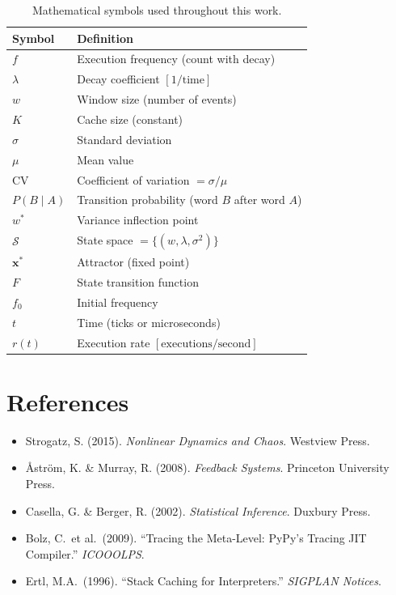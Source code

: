 \begin{table}[h]
\centering
\caption{Mathematical symbols used throughout this work.}
\label{tab:notation}
\begin{tabular}{ll}
\toprule
\textbf{Symbol} & \textbf{Definition} \\
\midrule
$f$ & Execution frequency (count with decay) \\
$\lambda$ & Decay coefficient $[1/\text{time}]$ \\
$w$ & Window size (number of events) \\
$K$ & Cache size (constant) \\
$\sigma$ & Standard deviation \\
$\mu$ & Mean value \\
$\mathrm{CV}$ & Coefficient of variation $= \sigma / \mu$ \\
$P(B \mid A)$ & Transition probability (word $B$ after word $A$) \\
$w^*$ & Variance inflection point \\
$\mathcal{S}$ & State space $= \{(w, \lambda, \sigma^2)\}$ \\
$\mathbf{x}^*$ & Attractor (fixed point) \\
$F$ & State transition function \\
$f_0$ & Initial frequency \\
$t$ & Time (ticks or microseconds) \\
$r(t)$ & Execution rate $[\text{executions}/\text{second}]$ \\
\bottomrule
\end{tabular}
\end{table}

\section*{References}

\begin{itemize}
  \item Strogatz, S. (2015). \emph{Nonlinear Dynamics and Chaos}. Westview
    Press.
  \item \r{A}str\"{o}m, K. \& Murray, R. (2008). \emph{Feedback Systems}.
    Princeton University Press.
  \item Casella, G. \& Berger, R. (2002). \emph{Statistical Inference}.
    Duxbury Press.
  \item Bolz, C.\ et al.\ (2009). ``Tracing the Meta-Level: PyPy's Tracing
    JIT Compiler.'' \emph{ICOOOLPS}.
  \item Ertl, M.A.\ (1996). ``Stack Caching for Interpreters.''
    \emph{SIGPLAN Notices}.
\end{itemize}
